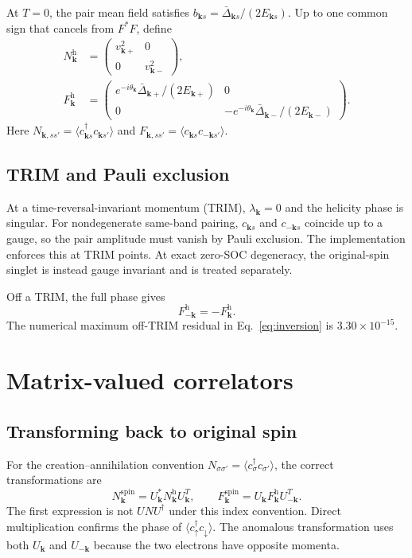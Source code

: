 \documentclass[11pt]{article}
\newcommand{\kb}{\mathbf k}
\begin{document}
At $T=0$, the pair mean field satisfies $b_{\kb s}=\bar\Delta_{\kb s}/(2E_{\kb s})$. Up to one common sign that cancels from $F^*F$, define
\begin{align}
N^{\mathrm h}_{\kb}
&=\begin{pmatrix}v_{\kb +}^2&0\\0&v_{\kb -}^2\end{pmatrix},
\label{eq:Nband}\\
F^{\mathrm h}_{\kb}
&=\begin{pmatrix}
e^{-i\theta_{\kb}}\bar\Delta_{\kb +}/(2E_{\kb +})&0\\
0&-e^{-i\theta_{\kb}}\bar\Delta_{\kb -}/(2E_{\kb -})
\end{pmatrix}.
\label{eq:Fband}
\end{align}
Here $N_{\kb,ss'}=\langle c_{\kb s}^{\dagger}c_{\kb s'}\rangle$ and $F_{\kb,ss'}=\langle c_{\kb s}c_{-\kb s'}\rangle$.

\subsection{TRIM and Pauli exclusion}

At a time-reversal-invariant momentum (TRIM), $\lambda_{\kb}=0$ and the helicity phase is singular. For nondegenerate same-band pairing, $c_{\kb s}$ and $c_{-\kb s}$ coincide up to a gauge, so the pair amplitude must vanish by Pauli exclusion. The implementation enforces this at TRIM points. At exact zero-SOC degeneracy, the original-spin singlet is instead gauge invariant and is treated separately.

Off a TRIM, the full phase gives
\begin{equation}
F^{\mathrm h}_{-\kb}=-F^{\mathrm h}_{\kb}.
\label{eq:inversion}
\end{equation}
The numerical maximum off-TRIM residual in Eq.~\eqref{eq:inversion} is $3.30\times10^{-15}$.

\section{Matrix-valued correlators}
\label{sec:correlators}

\subsection{Transforming back to original spin}

For the creation--annihilation convention $N_{\sigma\sigma'}=\langle c_\sigma^\dagger c_{\sigma'}\rangle$, the correct transformations are
\begin{equation}
\boxed{
N^{\mathrm{spin}}_{\kb}=U_{\kb}^{*}N^{\mathrm h}_{\kb}U_{\kb}^{T},
\qquad
F^{\mathrm{spin}}_{\kb}=U_{\kb}F^{\mathrm h}_{\kb}U_{-\kb}^{T}.
}
\label{eq:spin_transform}
\end{equation}
The first expression is not $UNU^\dagger$ under this index convention. Direct multiplication confirms the phase of $\langle c_\uparrow^\dagger c_\downarrow\rangle$. The anomalous transformation uses both $U_{\kb}$ and $U_{-\kb}$ because the two electrons have opposite momenta.
\end{document}
